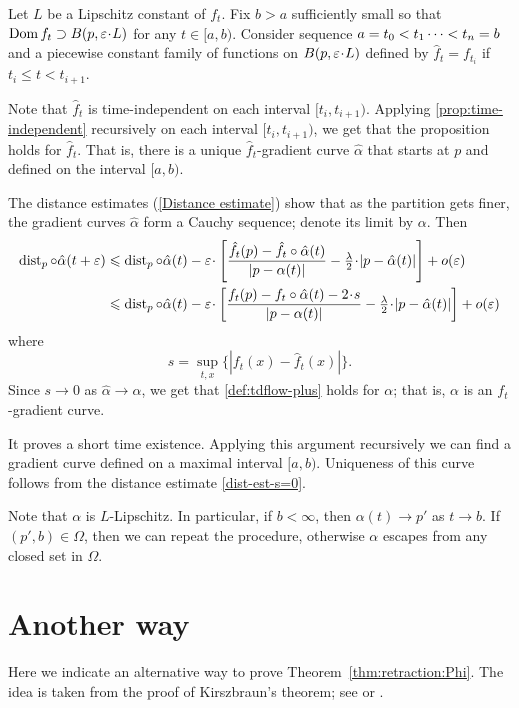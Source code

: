 \documentclass[oneside,a4paper, 12pt]{article}
\begin{document}
Let $L$ be a Lipschitz constant of $f_t$.
Fix $b>a$ sufficiently small so that $\Dom f_t\supset B(p,\eps\cdot L)$ for any $t\in[a,b)$.
Consider sequence  $a=t_0<t_1\dots<t_n\z=b$ and a piecewise constant family of functions on $B(p,\eps\cdot L)$ defined by $\hat f_t=f_{t_i}$ if $t_i\le t<t_{i+1}$.

Note that $\hat f_t$ is time-independent on each interval $[t_i,t_{i+1})$.
Applying \ref{prop:time-independent} recursively on each interval $[t_i,t_{i+1})$, we get that the proposition holds for $\hat f_t$.
That is, there is a unique $\hat f_t$-gradient curve $\hat \alpha$ that starts at $p$ and defined on the interval $[a,b)$.

The distance estimates (\ref{Distance estimate}) show that as the partition gets finer, the gradient curves $\hat\alpha$ form a Cauchy sequence; denote its limit by $\alpha$.
Then
\begin{align*}
\dist_p\circ\hat\alpha(t+\eps)
&\le 
\dist_p\circ\hat\alpha(t)
-\eps\cdot \left[\frac{\hat f_t(p)-\hat f_t\circ\hat\alpha(t)}{|p-\alpha(t)|}-\tfrac\lambda2\cdot |p-\hat\alpha(t)|\right]
+o(\eps)
\\
&\le 
\dist_p\circ\hat\alpha(t)
-\eps\cdot \left[\frac{f_t(p)-f_t\circ\hat\alpha(t)-2\cdot s}{|p-\alpha(t)|}-\tfrac\lambda2\cdot |p-\hat\alpha(t)|\right]
+o(\eps)
\end{align*}
where 
\[s=\sup_{t,x} \{|f_t(x)-\hat f_t(x)|\}.\]
Since $s\to 0$ as $\hat\alpha\to \alpha$, we get that \ref{def:tdflow-plus} holds for $\alpha$;
that is, $\alpha$ is an $f_t$-gradient curve.

It proves a short time existence.
Applying this argument recursively we can find a gradient curve defined on a maximal interval $[a,b)$.
Uniqueness of this curve follows from the distance estimate \ref{dist-est-s=0}. 

Note that $\alpha$ is $L$-Lipschitz.
In particular, if $b<\infty$, then $\alpha(t)\to p'$ as $t\to b$.
If $(p',b)\in \Omega$, then we can repeat the procedure, otherwise $\alpha$ escapes from any closed set in $\Omega$. 
\qeds

\section{Another way}\label{Another way}

Here we indicate an alternative way to prove Theorem~\ref{thm:retraction:Phi}.
The idea is taken from the proof of Kirszbraun's theorem; see \cite[5.1]{akp-kirszbraun} or \cite[9.4.1]{akp}. %
\end{document}
